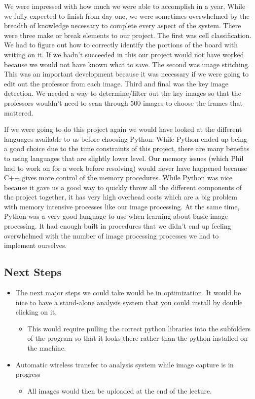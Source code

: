 \documentclass[]{article}
\begin{document}
			We were impressed with how much we were able to accomplish in a year. While we fully expected to finish from day one, we were sometimes overwhelmed by the breadth of knowledge necessary to complete every aspect of the system. There were three make or break elements to our project. The first was cell classification. We had to figure out how to correctly identify the portions of the board with writing on it. If we hadn’t succeeded in this our project would not have worked because we would not have known what to save. The second was image stitching. This was an important development because it was necessary if we were going to edit out the professor from each image. Third and final was the key image detection. We needed a way to determine/filter out the key images so that the professors wouldn’t need to scan through 500 images to choose the frames that mattered.
			
			If we were going to do this project again we would have looked at the different languages available to us before choosing Python. While Python ended up being a good choice due to the time constraints of this project, there are many benefits to using languages that are slightly lower level. Our memory issues (which Phil had to work on for a week before resolving) would never have happened because C++ gives more control of the memory procedures. While Python was nice because it gave us a good way to quickly throw all the different components of the project together, it has very high overhead costs which are a big problem with memory intensive processes like our image processing. At the same time, Python was a very good language to use when learning about basic image processing. It had enough built in procedures that we didn’t end up feeling overwhelmed with the number of image processing processes we had to implement ourselves.
		
		\subsection{Next Steps}
		
			\begin{itemize}
				\item The next major steps we could take would be in optimization. It would be nice to have a stand-alone analysis system that you could install by double clicking on it.
					\begin{itemize}
						\item This would require pulling the correct python libraries into the subfolders of the program so that it looks there rather than the python installed on the machine.
					\end{itemize}
				\item Automatic wireless transfer to analysis system while image capture is in progress
					\begin{itemize}
						\item All images would then be uploaded at the end of the lecture.
					\end{itemize}
			\end{itemize}
		
\end{document}
